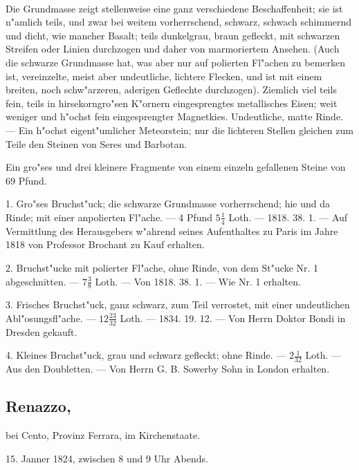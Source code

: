 \documentclass[a4paper, 11pt, oneside, polutonikogreek, german]{article}
\begin{document}
\paragraph{}
Die Grundmasse zeigt stellenweise eine ganz verschiedene Beschaffenheit; sie ist n"amlich teils, und zwar bei weitem vorherrschend, schwarz, schwach schimmernd und dicht, wie mancher Basalt; teils dunkelgrau, braun gefleckt, mit schwarzen Streifen oder Linien durchzogen und daher von marmoriertem Ansehen. (Auch die schwarze Grundmasse hat, was aber nur auf polierten Fl"achen zu bemerken ist, vereinzelte, meist aber undeutliche, lichtere Flecken, und ist mit einem breiten, noch schw"arzeren, aderigen Geflechte durchzogen). Ziemlich viel teils fein, teils in hirsekorngro"sen K"ornern eingesprengtes metallisches Eisen; weit weniger und h"ochst fein eingesprengter Magnetkies. Undeutliche, matte Rinde. --- Ein h"ochst eigent"umlicher Meteorstein; nur die lichteren Stellen gleichen zum Teile den Steinen von Seres und Barbotan.

Ein gro"ses und drei kleinere Fragmente von einem einzeln gefallenen Steine von 69 Pfund.

1. Gro"ses Bruchst"uck; die schwarze Grundmasse vorherrschend; hie und da Rinde; mit einer anpolierten Fl"ache. --- 4 Pfund $5\frac{1}{4}$ Loth. --- 1818. 38. 1. --- Auf Vermittlung des Herausgebers w"ahrend seines Aufenthaltes zu Paris im Jahre 1818 von Professor Brochant zu Kauf erhalten.

2. Bruchst"ucke mit polierter Fl"ache, ohne Rinde, von dem St"ucke Nr. 1 abgeschnitten. --- $7\frac{3}{8}$ Loth. --- Von 1818. 38. 1. --- Wie Nr. 1 erhalten.

3. Frisches Bruchst"uck, ganz schwarz, zum Teil verrostet, mit einer undeutlichen Abl"osungsfl"ache. --- $12\frac{23}{32}$ Loth. --- 1834. 19. 12. --- Von Herrn Doktor Bondi in Dresden gekauft.

4. Kleines Bruchst"uck, grau und schwarz gefleckt; ohne Rinde. --- $2\frac{1}{32}$ Loth. --- Aus den Doubletten. --- Von Herrn G. B. Sowerby Sohn in London erhalten.
\subsection[Renazzo.]{Renazzo,}
\begin{center}
\small
bei Cento, Provinz Ferrara, im Kirchenstaate.

15. Janner 1824, zwischen 8 und 9 Uhr Abends.
\end{center}
\end{document}
